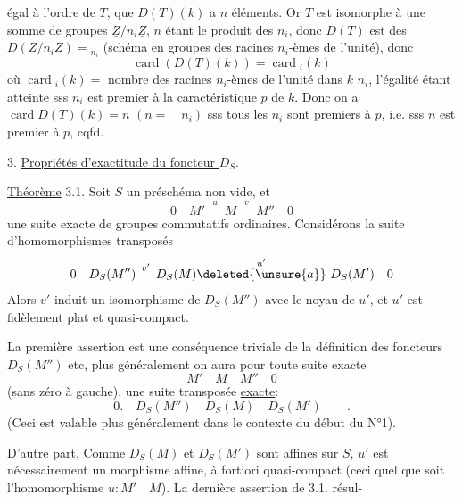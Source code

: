  égal à l'ordre de $T$, que $D(T)(k)$ a
 $n$ éléments. Or $T$ est isomorphe
à une somme de groupes $\underline Z/n_i\underline Z$, $n$ étant le
produit des $n_i$, donc $D(T)$ est 
 des $D(\underline Z/n_i\underline Z)={}_{n_i}$
(schéma en groupes des racines $n_i$-èmes de l'unité), donc
\[
 \operatorname{card}(D(T)(k))=\operatorname{card}{}_{i}(k)
\]
où $\operatorname{card}{}_{i}(k)=$ nombre des racines $n_i$-èmes de
l'unité dans $k$ \quad $n_i$, l'égalité étant atteinte sss $n_i$
est premier à la caractéristique $p$ de $k$. Donc on a
$\operatorname{card}D(T)(k)=n$
$(n=\quad n_i)$ sss tous les $n_i$ sont premiers à $p$, i.e. sss
$n$ est premier à $p$, cqfd.

3. \uline{Propriétés d'exactitude du foncteur $D_S$}.

\uline{Théorème} 3.1. Soit $S$ un préschéma non vide,
 et
\[
 0\quad M'\overset{u}{\phantom{\longrightarrow}}M
 \overset{v}{\phantom{\longrightarrow}}M''\quad0
\]
une suite exacte de groupes commutatifs ordinaires. Considérons
la suite d'homomorphismes transposés
\[
 0\quad D_S(M'')\overset{v'}{\phantom{\longrightarrow}}D_S(M)
 \overset{u'}{\deleted{\unsure{a}}}\ D_S(M')\quad0
\]
Alors $v'$ induit un isomorphisme de  $D_S(M'')$
avec le noyau de $u'$, et $u'$ est fidèlement plat et quasi-compact.

La première assertion est une conséquence triviale de la définition
des foncteurs $D_S(M'')$ etc, plus généralement on aura pour toute
suite exacte
\[
 M'\quad M\quad M''\quad0
\]
(sans zéro à gauche), une suite transposée \uline{exacte}:
\[
 0.\quad D_S(M'')\quad D_S(M)\quad D_S(M')\qquad.
\]
(Ceci est valable plus généralement dans le contexte du début du N°1).

D'autre part, Comme $D_S(M)$ et $D_S(M')$ sont affines sur $S$,
$u'$ est nécessairement un morphisme affine, à fortiori quasi-compact
(ceci quel que soit l'homomorphisme $u:M'\quad M$). La dernière assertion
de 3.1. résul-
